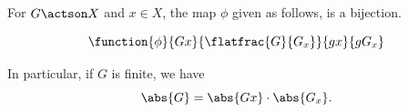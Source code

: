 \begin{theorem}
    \label{thm:orbit-stabiliser}%
    For \(G \actson X\) and \(x \in X\), the map \(\phi\) given as follows, is a bijection.

    \[
        \function{\phi}{Gx}{\flatfrac{G}{G_x}}{gx}{g G_x}
    \]
    
    In particular, if \(G\) is finite, we have
    \[
        \abs{G} = \abs{Gx} \cdot \abs{G_x}.
    \]
\end{theorem}